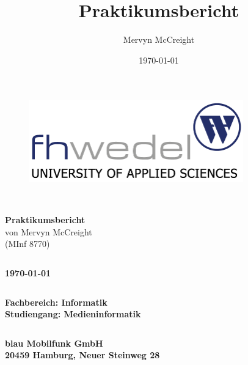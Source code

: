 \documentclass[a4paper, 12pt, hidelinks]{article}
\title{Praktikumsbericht}
\author{Mervyn McCreight}
\date{\today}
\begin{document}


\begin{figure}[h]
\centering
\includegraphics[width=350px]{fhwedel}
\label{fig:fhwedel}
\end{figure}




\begin{verbatim}


\end{verbatim}

\begin{center}
\textbf{\LARGE{Praktikumsbericht}}\\
von Mervyn McCreight\\
(MInf 8770)
\end{center}

\begin{verbatim}
\end{verbatim}

\begin{center}
\textbf{\today}
\end{center}

\begin{verbatim}

\end{verbatim}

\begin{center}
\textbf{\large{Fachbereich: Informatik}} \\
\textbf{\large{Studiengang: Medieninformatik}}
\end{center}

\begin{verbatim}

\end{verbatim}


\begin{center}
\textbf{\large{blau Mobilfunk GmbH}} \\
\textbf{\large{20459 Hamburg, Neuer Steinweg 28}} \\
\end{center}
\end{document}

